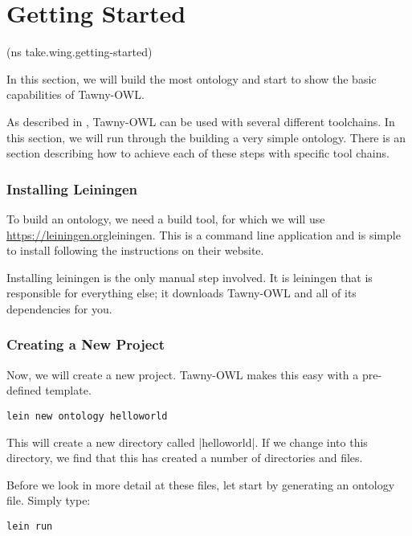 \chapter{Getting Started}
\label{cha:getting-started}

\begin{tawnyhidden}
(ns take.wing.getting-started)
\end{tawnyhidden}

In this section, we will build the most ontology and start to show the
basic capabilities of Tawny-OWL.

As described in \label{/the/environment-the-environment}, Tawny-OWL can be
used with several different toolchains. In this section, we will run
through the building a very simple ontology. There is an section describing
how to achieve each of these steps with specific tool chains.

\subsection{Installing Leiningen}
\label{sec:installing-leiningen}

To build an ontology, we need a build tool, for which we will use
\url{https://leiningen.org}{leiningen}. This is a command line
application and is simple to install following the instructions on
their website.

Installing leiningen is the only manual step involved. It is leiningen
that is responsible for everything else; it downloads Tawny-OWL and
all of its dependencies for you.

\subsection{Creating a New Project}
\label{sec:creating-new-project}

Now, we will create a new project. Tawny-OWL makes this easy with a
pre-defined template.

\begin{verbatim}
lein new ontology helloworld
\end{verbatim}

This will create a new directory called |helloworld|. If we change
into this directory, we find that this has created a number of
directories and files.

Before we look in more detail at these files, let start by generating
an ontology file. Simply type:

\begin{verbatim}
lein run
\end{verbatim}

